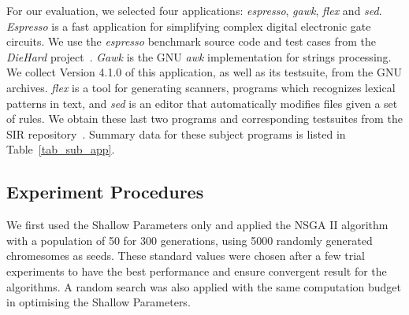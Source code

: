 For our evaluation, we selected four applications: \emph{espresso}, \emph{gawk}, \emph{flex} and \emph{sed}. \emph{Espresso} is a fast application for simplifying complex digital electronic gate circuits. We use the \emph{espresso} benchmark source code and test cases from the \emph{DieHard} project~\cite{Berger:2006:DPM:1133981.1134000}. \emph{Gawk} is the GNU \emph{awk} implementation for strings processing. We collect Version 4.1.0 of this application, as well as its testsuite, from the GNU archives. \emph{flex} is a tool for generating scanners, programs which recognizes lexical patterns in text, and \emph{sed} is an editor that automatically modifies files given a set of rules. We obtain these last two programs and corresponding testsuites from the SIR repository~\cite{SIR2005}. Summary data for these subject programs is listed in Table~\ref{tab_sub_app}.
%


\subsection{Experiment Procedures}

We first used the Shallow Parameters only and applied the NSGA II algorithm
with a population of 50 for 300 generations, using 5000 randomly generated
chromesomes as seeds. 
These standard values were chosen after a few trial experiments to have the best performance and ensure convergent result for the algorithms. 
A random search was also applied with the same computation budget in optimising the Shallow Parameters. 

